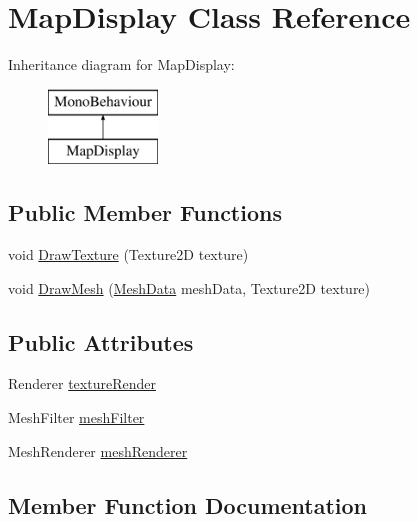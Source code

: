 \hypertarget{class_map_display}{}\section{Map\+Display Class Reference}
\label{class_map_display}
Inheritance diagram for Map\+Display\+:\begin{figure}[H]
\begin{center}
\leavevmode
\includegraphics[height=2.000000cm]{class_map_display}
\end{center}
\end{figure}
\subsection*{Public Member Functions}
\begin{DoxyCompactItemize}
\item 
void \mbox{\hyperlink{class_map_display_a27468745a8df537d3da3d0ce5814fc5b}{Draw\+Texture}} (Texture2D texture)
\item 
void \mbox{\hyperlink{class_map_display_a051aac4836942702d88eac0732e0bd52}{Draw\+Mesh}} (\mbox{\hyperlink{class_mesh_data}{Mesh\+Data}} mesh\+Data, Texture2D texture)
\end{DoxyCompactItemize}
\subsection*{Public Attributes}
\begin{DoxyCompactItemize}
\item 
Renderer \mbox{\hyperlink{class_map_display_acb52594fb49690c89c4929a3bbb34b61}{texture\+Render}}
\item 
Mesh\+Filter \mbox{\hyperlink{class_map_display_a56e864aaaecac3844a10fd98a69e0ab0}{mesh\+Filter}}
\item 
Mesh\+Renderer \mbox{\hyperlink{class_map_display_aa517e3c2a6f717cd74a8554e01476a1f}{mesh\+Renderer}}
\end{DoxyCompactItemize}


\subsection{Member Function Documentation}
\mbox{\label{class_map_display_a051aac4836942702d88eac0732e0bd52}} 
